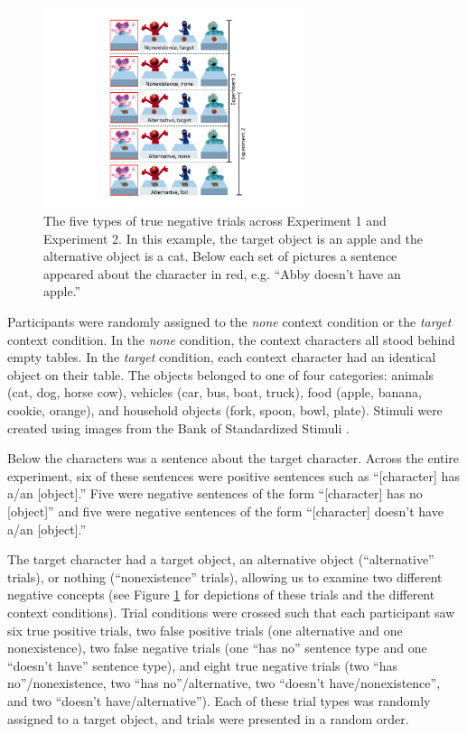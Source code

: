 \documentclass[10pt,letterpaper]{article}
\begin{document}
\begin{figure}[t]
\begin{center} 
\includegraphics[width=3in]{figures/trialtypes.pdf}
\caption{\label{fig:trial} The five types of true negative trials across Experiment 1 and Experiment 2.  In this example, the target object is an apple and the alternative object is a cat. Below each set of pictures a sentence appeared about the character in red, e.g. ``Abby doesn't have an apple.''}  
\vspace{-1cm}
\end{center} 
\end{figure}

Participants were randomly assigned to the \emph{none} context condition or the \emph{target} context condition.  In the \emph{none} condition, the context characters all stood behind empty tables.  In the \emph{target} condition, each context character had an identical object on their table.  The objects belonged to one of four categories: animals (cat, dog, horse cow), vehicles (car, bus, boat, truck), food (apple, banana, cookie, orange), and household objects (fork, spoon, bowl, plate).  Stimuli were created using images from the Bank of Standardized Stimuli \cite{brodeur2010}.  

Below the characters was a sentence about the target character.  Across the entire experiment, six of these sentences were positive sentences such as ``[character] has a/an [object].''  Five were negative sentences of the form ``[character] has no [object]'' and five were negative sentences of the form ``[character] doesn't have a/an [object].'' 

The target character had a target object, an alternative object (``alternative'' trials), or nothing (``nonexistence'' trials), allowing us to examine two different negative concepts (see Figure \ref{fig:trial} for depictions of these trials and the different context conditions).    Trial conditions were crossed such that each participant saw six true positive trials, two false positive trials (one alternative and one nonexistence), two false negative trials (one ``has no'' sentence type and one ``doesn't have'' sentence type), and eight true negative trials (two ``has no''/nonexistence, two ``has no''/alternative, two ``doesn't have/nonexistence'', and two ``doesn't have/alternative'').  Each of these trial types was randomly assigned to a target object, and trials were presented in a random order.  
\end{document}
